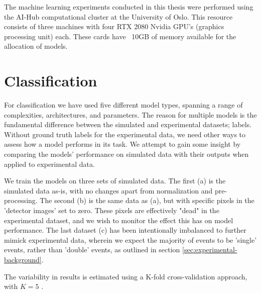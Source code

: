 The machine learning experiments conducted in this thesis were performed
using the AI-Hub computational cluster at the University of Oslo. This resource 
consists of three machines with four RTX 2080 Nvidia GPU’s (graphics
processing unit) each. These cards have ~10GB of memory available for the
allocation of models.
\section{Classification}
For classification we have used five different model types,
spanning a range of complexities, architectures, and parameters.
The reason for multiple models is the fundamental difference between the
simulated and experimental datasets; labels. Without ground truth labels
for the experimental data, we need other ways to assess how a model performs in
its task. We attempt to gain some insight by comparing the models' performance on
simulated data with their outputs when applied to experimental data.

\noindent We train the models on three sets of simulated data.
The first (a) is the simulated data as-is, with no changes apart from normalization
and pre-processing. The second (b) is the same data as (a), but with specific pixels in
the 'detector images' set to zero. These pixels are effectively "dead" in the
experimental dataset, and we wish to monitor the effect this has on model performance.
The last dataset (c) has been intentionally imbalanced to further mimick experimental data,
wherein we expect the majority of events to be 'single' events, rather than 'double'
events, as outlined in section \ref{sec:experimental-background}.

\noindent The variability in results is estimated using a K-fold cross-validation approach, with
$K = 5$ \cite{Stone1974}.

